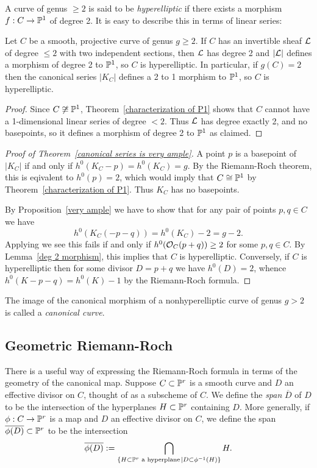 A curve of genus $\geq 2$
is said to be \emph{hyperelliptic} if there exists a morphism $f: C \to {\mathbb P}^1$ of degree 2. 
It is easy to describe this in terms of linear series:

\begin{lemma}\label{deg 2 morphism}
Let $C$ be a smooth, projective curve of genus $g\geq 2$. If $C$ has an invertible sheaf ${\mathcal L}$ of degree $\leq 2$ with two independent sections, then ${\mathcal L}$ has degree 2 and
$|{\mathcal L}|$ defines a morphism of degree 2 to ${\mathbb P}^{1}$, so $C$ is hyperelliptic. In particular, if $g(C) = 2$ then the canonical series $|K_{C}|$ defines a 2 to 1 morphism to ${\mathbb P}^{1}$, so $C$ is hyperelliptic.
\end{lemma}

\begin{proof}
Since $C \not\cong {\mathbb P}^1$,  Theorem~\ref{characterization of P1} shows that $C$ cannot have a 1-dimensional linear series
of degree $< 2$. Thus ${\mathcal L}$ has degree exactly 2, and no basepoints, so it defines a morphism of degree 2 to ${\mathbb P}^1$ as claimed.
\end{proof}

\begin{proof}[Proof of Theorem~\ref{canonical series is very ample}]
A point $p$ is a basepoint of $|K_C|$ if and only if $h^0(K_C-p) = h^0(K_C) = g$. By the Riemann-Roch theorem,
this is eqivalent to $h^0(p) =2$, which would imply that $C\cong {\mathbb P}^1$ by Theorem~\ref{characterization of P1}. Thus $K_C$
has no basepoints.

By Proposition~\ref{very ample} we have to show that for any pair of points $p, q \in C$ we have
$$
h^0(K_C(-p-q)) = h^0(K_C)-2 = g-2.
$$
Applying \trr we see this fails if and only if $h^0({\mathcal O}_C(p+q)) \geq 2$ for some $p,q \in C$. By Lemma~\ref{deg 2 morphism}, this implies that $C$ is hyperelliptic. Conversely, if $C$ is hyperelliptic then for some divisor $D = p+q$ we have $h^0(D) = 2$, whence $h^0(K-p-q) = h^0(K) -1$ by
the Riemann-Roch formula.
\end{proof}

The image of the canonical morphism of a nonhyperelliptic curve of genus $g>2$ is called a \emph{canonical curve}.


\subsection{Geometric Riemann-Roch}

There is a useful way of expressing the Riemann-Roch formula in terms of the geometry of the canonical map. Suppose $C \subset {\mathbb P}^r$ is a smooth curve and $D$ an effective divisor on $C$, thought of as a subscheme of $C$. We define the \emph{span} $\overline D$ of $D$ to be the intersection of the hyperplanes $H \subset {\mathbb P}^r$ containing $D$. More generally, if $\phi : C \to {\mathbb P}^r$ is a map and $D$ an effective divisor on $C$, we define the span $\overline{\phi(D)} \subset {\mathbb P}^r$ to be the intersection
$$
\overline{\phi(D)} := \bigcap_{ \{H \subset {\mathbb P}^r \text{ a hyperplane}\kern1pt \mid D \subset \phi^{-1}(H)\}} H.
$$

